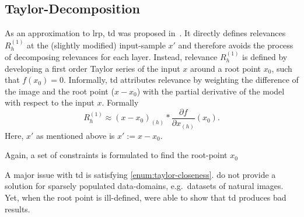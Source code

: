 \subsection{Taylor-Decomposition}\label{subsect:td}
As an approximation to \gls{lrp}, \gls{td} was proposed in~\cite{Bach.2015}. It directly defines relevances \(R_{h}^{(1)}\) at the (slightly modified) input-sample \(x'\) and therefore avoids the process of decomposing relevances for each layer. Instead, relevance \(R_{h}^{(1)}\) is defined by developing a first order Taylor series of the input \(x\) around a root point \(x_0\), such that \(f(x_0) = 0\). Informally, \gls{td} attributes relevance by weighting the difference of the image and the root point (\(x-x_0\)) with the partial derivative of the model with respect to the input \(x\). Formally
\begin{equation}
    R_{h}^{(1)} \approx (x-x_0)_{(h)} * \frac{\partial f}{\partial x_{(h)}}(x_0).
\end{equation}
Here, \(x'\) as mentioned above is \(x':=x-x_0\).
\par
Again, a set of constraints is formulated to find the root-point \(x_0\)
A major issue with \gls{td} is satisfying \cref{enum:taylor-closeness}.  do not provide a solution for sparsely populated data-domains, e.g.\ datasets of natural images. Yet, when the root point is ill-defined,  were able to show that \gls{td} produces bad results.